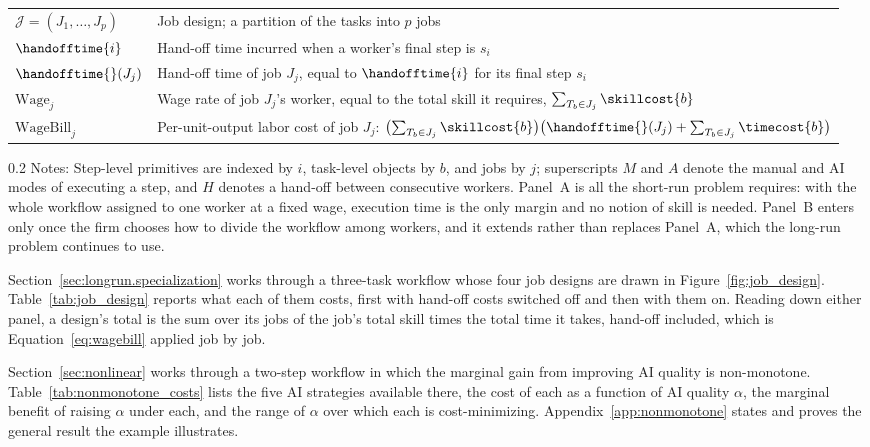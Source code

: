 \begin{table}[!t]
\begin{tabularx}{\textwidth}{l X}
$\mathcal{J} = (J_1, \dotsc, J_p)$ & Job design; a partition of the tasks into $p$ jobs \\
\addlinespace
$\handofftime{i}$ & Hand-off time incurred when a worker's final step is $s_i$ \\
$\handofftime{}(J_j)$ & Hand-off time of job $J_j$, equal to $\handofftime{i}$ for its final step $s_i$ \\
\addlinespace
$\text{Wage}_j$ & Wage rate of job $J_j$'s worker, equal to the total skill it requires, $\sum_{T_b \in J_j} \skillcost{b}$ \\
$\text{WageBill}_j$ & Per-unit-output labor cost of job $J_j$: $\bigl(\sum_{T_b \in J_j} \skillcost{b}\bigr)\bigl(\handofftime{}(J_j) + \sum_{T_b \in J_j} \timecost{b}\bigr)$ \\
\bottomrule
\end{tabularx}

\begin{minipage}{1\linewidth}
\begin{spacing}{0.2}
{\fontsize{9.5pt}{10pt}\selectfont Notes: Step-level primitives are indexed by $i$, task-level objects by $b$, and jobs by $j$; superscripts $M$ and $A$ denote the manual and AI modes of executing a step, and $H$ denotes a hand-off between consecutive workers.
Panel~A is all the short-run problem requires: with the whole workflow assigned to one worker at a fixed wage, execution time is the only margin and no notion of skill is needed.
Panel~B enters only once the firm chooses how to divide the workflow among workers, and it extends rather than replaces Panel~A, which the long-run problem continues to use.}
\end{spacing}
\end{minipage}
\end{table}

Section~\ref{sec:longrun.specialization} works through a three-task workflow whose four job designs are drawn in Figure~\ref{fig:job_design}.
Table~\ref{tab:job_design} reports what each of them costs, first with hand-off costs switched off and then with them on.
Reading down either panel, a design's total is the sum over its jobs of the job's total skill times the total time it takes, hand-off included, which is Equation~\eqref{eq:wagebill} applied job by job.

Section~\ref{sec:nonlinear} works through a two-step workflow in which the marginal gain from improving AI quality is non-monotone.
Table~\ref{tab:nonmonotone_costs} lists the five AI strategies available there, the cost of each as a function of AI quality $\alpha$, the marginal benefit of raising $\alpha$ under each, and the range of $\alpha$ over which each is cost-minimizing.
Appendix~\ref{app:nonmonotone} states and proves the general result the example illustrates.

